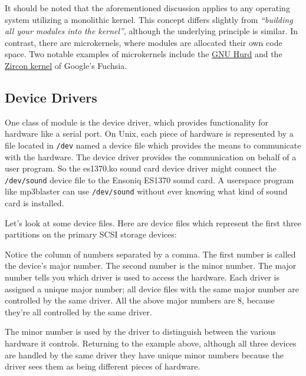 \documentclass[10pt, oneside]{book}
\begin{document}
It should be noted that the aforementioned discussion applies to any operating system utilizing a monolithic kernel.
This concept differs slightly from \emph{``building all your modules into the kernel''},
although the underlying principle is similar.
In contrast, there are microkernels, where modules are allocated their own code space.
Two notable examples of microkernels include the \href{https://www.gnu.org/software/hurd/}{GNU Hurd} and the \href{https://fuchsia.dev/fuchsia-src/concepts/kernel}{Zircon kernel} of Google's Fuchsia.

\subsection{Device Drivers}
\label{sec:device_drivers}
One class of module is the device driver, which provides functionality for hardware like a serial port.
On Unix, each piece of hardware is represented by a file located in \verb|/dev| named a device file which provides the means to communicate with the hardware.
The device driver provides the communication on behalf of a user program.
So the es1370.ko sound card device driver might connect the \verb|/dev/sound| device file to the Ensoniq ES1370 sound card.
A userspace program like mp3blaster can use \verb|/dev/sound| without ever knowing what kind of sound card is installed.

Let's look at some device files.
Here are device files which represent the first three partitions on the primary SCSI storage devices:


Notice the column of numbers separated by a comma.
The first number is called the device's major number.
The second number is the minor number.
The major number tells you which driver is used to access the hardware.
Each driver is assigned a unique major number; all device files with the same major number are controlled by the same driver.
All the above major numbers are 8, because they're all controlled by the same driver.

The minor number is used by the driver to distinguish between the various hardware it controls.
Returning to the example above, although all three devices are handled by the same driver they have unique minor numbers because the driver sees them as being different pieces of hardware.
\end{document}
